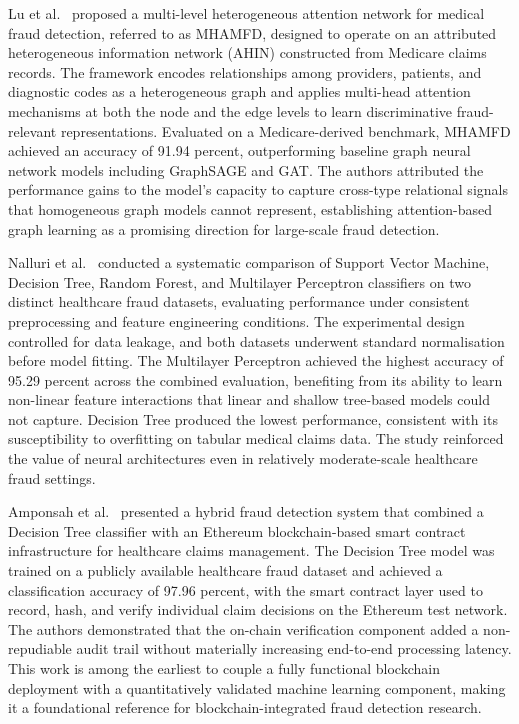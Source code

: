 Lu et al.\ \cite{lu2023} proposed a multi-level heterogeneous attention network for medical fraud detection, referred to as MHAMFD, designed to operate on an attributed heterogeneous information network (AHIN) constructed from Medicare claims records. The framework encodes relationships among providers, patients, and diagnostic codes as a heterogeneous graph and applies multi-head attention mechanisms at both the node and the edge levels to learn discriminative fraud-relevant representations. Evaluated on a Medicare-derived benchmark, MHAMFD achieved an accuracy of 91.94 percent, outperforming baseline graph neural network models including GraphSAGE and GAT. The authors attributed the performance gains to the model's capacity to capture cross-type relational signals that homogeneous graph models cannot represent, establishing attention-based graph learning as a promising direction for large-scale fraud detection.

Nalluri et al.\ \cite{nalluri2023} conducted a systematic comparison of Support Vector Machine, Decision Tree, Random Forest, and Multilayer Perceptron classifiers on two distinct healthcare fraud datasets, evaluating performance under consistent preprocessing and feature engineering conditions. The experimental design controlled for data leakage, and both datasets underwent standard normalisation before model fitting. The Multilayer Perceptron achieved the highest accuracy of 95.29 percent across the combined evaluation, benefiting from its ability to learn non-linear feature interactions that linear and shallow tree-based models could not capture. Decision Tree produced the lowest performance, consistent with its susceptibility to overfitting on tabular medical claims data. The study reinforced the value of neural architectures even in relatively moderate-scale healthcare fraud settings.

Amponsah et al.\ \cite{amponsah2022} presented a hybrid fraud detection system that combined a Decision Tree classifier with an Ethereum blockchain-based smart contract infrastructure for healthcare claims management. The Decision Tree model was trained on a publicly available healthcare fraud dataset and achieved a classification accuracy of 97.96 percent, with the smart contract layer used to record, hash, and verify individual claim decisions on the Ethereum test network. The authors demonstrated that the on-chain verification component added a non-repudiable audit trail without materially increasing end-to-end processing latency. This work is among the earliest to couple a fully functional blockchain deployment with a quantitatively validated machine learning component, making it a foundational reference for blockchain-integrated fraud detection research.

